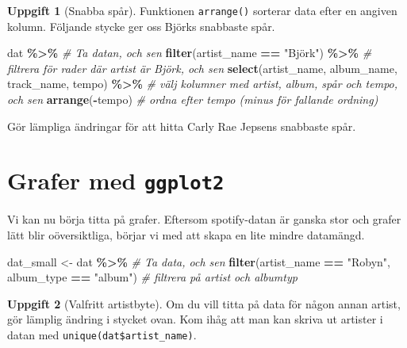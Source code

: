 \documentclass[
]{book}
\newenvironment{Shaded}{\begin{snugshade}}{\end{snugshade}}
\newcommand{\CommentTok}[1]{\textcolor[rgb]{0.56,0.35,0.01}{\textit{#1}}}
\newcommand{\FunctionTok}[1]{\textcolor[rgb]{0.13,0.29,0.53}{\textbf{#1}}}
\newcommand{\NormalTok}[1]{#1}
\newcommand{\OtherTok}[1]{\textcolor[rgb]{0.56,0.35,0.01}{#1}}
\newcommand{\SpecialCharTok}[1]{\textcolor[rgb]{0.81,0.36,0.00}{\textbf{#1}}}
\newcommand{\StringTok}[1]{\textcolor[rgb]{0.31,0.60,0.02}{#1}}
\theoremstyle{definition}
\theoremstyle{definition}
\theoremstyle{definition}
\newtheorem{exercise}{Uppgift}[chapter]
\theoremstyle{definition}
\theoremstyle{remark}
\begin{document}
\begin{exercise}[Snabba spår]
Funktionen \texttt{arrange()} sorterar data efter en angiven kolumn. Följande stycke ger oss Björks snabbaste spår.

\begin{Shaded}
\begin{Highlighting}[]
\NormalTok{dat }\SpecialCharTok{\%\textgreater{}\%}                                                    \CommentTok{\# Ta datan, och sen}
  \FunctionTok{filter}\NormalTok{(artist\_name }\SpecialCharTok{==} \StringTok{"Björk"}\NormalTok{) }\SpecialCharTok{\%\textgreater{}\%}                       \CommentTok{\# filtrera för rader där artist är Björk, och sen}
  \FunctionTok{select}\NormalTok{(artist\_name, album\_name, track\_name, tempo) }\SpecialCharTok{\%\textgreater{}\%}   \CommentTok{\# välj kolumner med artist, album, spår och tempo, och sen}
  \FunctionTok{arrange}\NormalTok{(}\SpecialCharTok{{-}}\NormalTok{tempo)                                          }\CommentTok{\# ordna efter tempo (minus för fallande ordning)}
\end{Highlighting}
\end{Shaded}

Gör lämpliga ändringar för att hitta Carly Rae Jepsens snabbaste spår.
\end{exercise}

\hypertarget{grafer-med-ggplot2}{%
\section{\texorpdfstring{Grafer med \texttt{ggplot2}}{Grafer med ggplot2}}\label{grafer-med-ggplot2}}

Vi kan nu börja titta på grafer. Eftersom spotify-datan är ganska stor och grafer lätt blir oöversiktliga, börjar vi med att skapa en lite mindre datamängd.

\begin{Shaded}
\begin{Highlighting}[]
\NormalTok{dat\_small }\OtherTok{\textless{}{-}}\NormalTok{ dat }\SpecialCharTok{\%\textgreater{}\%}                                      \CommentTok{\# Ta data, och sen}
  \FunctionTok{filter}\NormalTok{(artist\_name }\SpecialCharTok{==} \StringTok{"Robyn"}\NormalTok{, album\_type }\SpecialCharTok{==} \StringTok{"album"}\NormalTok{)   }\CommentTok{\# filtrera på artist och albumtyp}
\end{Highlighting}
\end{Shaded}

\begin{exercise}[Valfritt artistbyte]
Om du vill titta på data för någon annan artist, gör lämplig ändring i stycket ovan. Kom ihåg att man kan skriva ut artister i datan med \texttt{unique(dat\$artist\_name)}.
\end{exercise}
\end{document}
